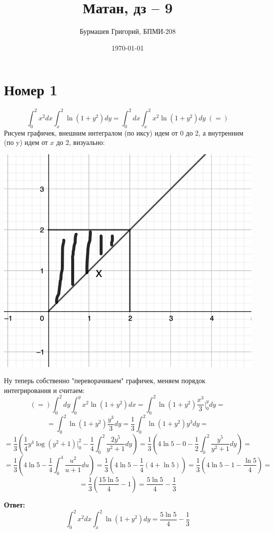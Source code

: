 \documentclass[a4paper,12pt]{article}
\author{Бурмашев Григорий, БПМИ-208}
\title{Матан, дз -- 9}
\date{\today}
\begin{document}
\maketitle
\section*{Номер 1}
\[
\int_{0}^{2} x^2 dx \int_{x}^{2} \ln(1 + y^2) dy = \int_{0}^{2}  dx \int_{x}^{2} x^2 \ln(1 + y^2) dy \; (=)
\]
Рисуем графичек, внешним интегралом (по иксу) идем от 0 до 2, а внутренним (по y) идем от $x$ до 2, визуально:
\begin{center}
\includegraphics[scale=0.4]{1.png}
\end{center}
Ну теперь собственно "переворачиваем" \; графичек,  меняем порядок интегрирования и считаем:
\[
(=) \int_{0}^{2}  dy \int_{0}^{y} x^2 \ln(1 + y^2) dx  = \int_{0}^{2}  \ln(1 + y^2) \frac{x^3}{3}  \bigg|_0^y dy = 
\]
\[
= \int_{0}^{2}  \ln(1 + y^2) \frac{y^3}{3}  dy = \frac{1}{3} \int_{0}^{2}  \ln(1 + y^2) y^3  dy=
\] 
\[
=\frac{1}{3} \left( \frac{1}{4} y^4 \log (y^2 + 1) \bigg|_0^2 - \frac{1}{4} \int_0^2 \frac{2y^5}{y^2 + 1} dy \right)  = \frac{1}{3} \left(4 \ln 5 - 0 - \frac{1}{2}\int_0^2 \frac{y^5}{y^2 + 1} dy \right) =
\]
\[
=
\frac{1}{3} \left(4 \ln 5 - \frac{1}{4} \int_0^4 \frac{u^2}{u + 1} du \right) = \frac{1}{3} \left(4 \ln 5 - \frac{1}{4} \left(4 + \ln5 \right) \right)  = \frac{1}{3} \left(4 \ln 5 - 1 - \frac{\ln5}{4}\right) =
\]
\[
=\frac{1}{3} \left(\frac{15\ln5}{4} - 1\right) =  \frac{5 \ln 5}{4 } - \frac{1}{3}
\]
\begin{center}
\textbf{Ответ: } 
\[
\int_{0}^{2} x^2 dx \int_{x}^{2} \ln(1 + y^2) dy = \frac{5 \ln 5}{4 } - \frac{1}{3}
\]
\end{center}
\clearpage
\end{document}
